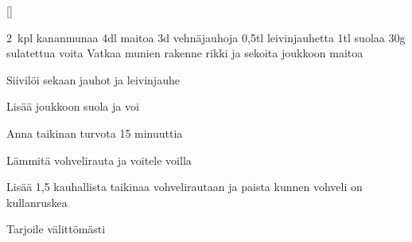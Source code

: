 []


\begin{step}
  2~kpl kananmunaa
  4dl maitoa
  3d vehnäjauhoja
  0,5tl leivinjauhetta
  1tl suolaa
  30g sulatettua voita
\method
Vatkaa munien rakenne rikki ja sekoita joukkoon maitoa

Siivilöi sekaan jauhot ja leivinjauhe

Lisää joukkoon suola ja voi

Anna taikinan turvota 15 minuuttia

Lämmitä vohvelirauta ja voitele voilla

Lisää 1,5 kauhallista taikinaa vohvelirautaan ja paista kunnen vohveli on kullanruskea

Tarjoile välittömästi
\end{step}

